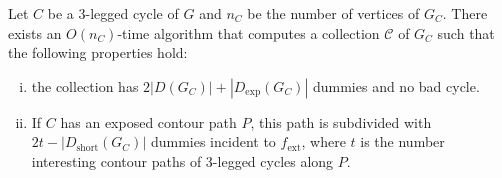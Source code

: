 \documentclass[runningheads]{llncs}
\newcommand{\ext}{\operatorname{ext}}
\newcommand{\short}{\operatorname{short}}
\begin{document}
\begin{lemma}
\label{app-le:cubic-unbentT}
Let $C$ be a 3-legged cycle of $G$ and $n_C$ be the number of vertices of $G_C$. There exists an $O(n_C)$-time algorithm that computes a collection $\mathcal{C}$ of $G_C$ such that the following properties hold:
\begin{enumerate}[(i)]
    \item the collection has $2|D(G_C)|+|D_{\exp}(G_C)|$ dummies and no bad cycle.
    \item If $C$ has an exposed contour path $P$, this path  is subdivided with $2t-|D_{\short}(G_C)|$ dummies incident to $f_{\ext}$, where $t$ is the number interesting contour paths of 3-legged cycles along $P$.
\end{enumerate} 
\end{lemma}
\end{document}
